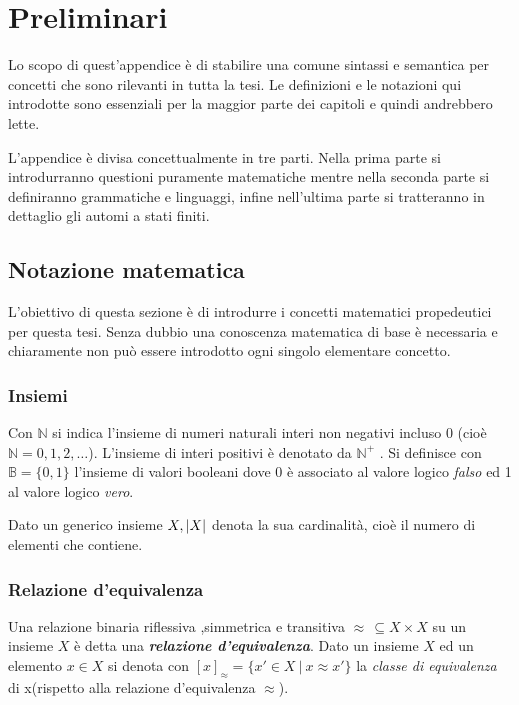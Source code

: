 
\chapter{Preliminari} %
\label{app:uno}
Lo scopo di quest'appendice è di stabilire una comune sintassi e semantica per concetti che sono rilevanti in tutta la tesi. Le definizioni e le notazioni qui introdotte sono essenziali per la maggior parte dei capitoli e quindi andrebbero lette.

L'appendice è divisa concettualmente in tre parti. Nella prima parte si introdurranno questioni  puramente matematiche mentre nella seconda parte si definiranno grammatiche e linguaggi, infine nell'ultima parte si tratteranno in dettaglio gli automi a stati finiti. 

\section{Notazione matematica}
L'obiettivo di questa sezione è di introdurre i concetti matematici propedeutici per questa tesi. Senza dubbio una conoscenza matematica di base è necessaria e chiaramente non può essere introdotto ogni singolo elementare concetto.
\subsection{Insiemi}
Con $\mathbb{N}$ si indica l'insieme di numeri naturali interi non negativi incluso 0 (cioè $\mathbb{N} = {0,1,2,\dots}$). L'insieme di interi positivi è denotato da $\mathbb{N}^{+}$ . Si definisce con $\mathbb{B} = \{0,1\}$ l'insieme di valori booleani dove 0 è associato al valore logico \textit{falso} ed 1 al valore logico \textit{vero}.

Dato un generico insieme $X, \lvert X\rvert$ denota la sua cardinalità, cioè il numero di elementi che contiene.
\subsection{Relazione d'equivalenza}
Una relazione binaria riflessiva ,simmetrica e transitiva  $\approx \, \subseteq X\!\times{}\!X$ su un insieme $X$ è detta una \textbf{\textit{relazione d'equivalenza}}. Dato un insieme $X$ ed un elemento $x \in X$ si denota con $[x]_\approx = \{x' \in X\ | \: x \approx x'\}$ la \textit{classe di equivalenza} di x(rispetto alla relazione d'equivalenza $\approx$).

